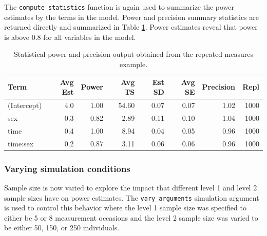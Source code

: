 \documentclass[man,mask,floatsintext]{apa6}
\newenvironment{Shaded}{\begin{snugshade}}{\end{snugshade}}
\newcommand{\DataTypeTok}[1]{\textcolor[rgb]{0.13,0.29,0.53}{#1}}
\newcommand{\KeywordTok}[1]{\textcolor[rgb]{0.13,0.29,0.53}{\textbf{#1}}}
\newcommand{\NormalTok}[1]{#1}
\newcommand{\OperatorTok}[1]{\textcolor[rgb]{0.81,0.36,0.00}{\textbf{#1}}}
\newcommand{\OtherTok}[1]{\textcolor[rgb]{0.56,0.35,0.01}{#1}}
\newcommand{\StringTok}[1]{\textcolor[rgb]{0.31,0.60,0.02}{#1}}
\begin{document}
The \texttt{compute\_statistics} function is again used to summarize the power estimates by the terms in the model. Power and precision summary statistics are returned directly and summarized in Table \ref{tab:long-power}. Power estimates reveal that power is above 0.8 for all variables in the model.

\begin{Shaded}
\end{Shaded}

\begin{table}[t]

\caption{\label{tab:long-power}Statistical power and precision output obtained from the repeated measures example.}
\centering
\begin{tabular}{lrrrrrrr}
\toprule
Term & Avg Est & Power & Avg TS & Est SD & Avg SE & Precision & Repl\\
\midrule
(Intercept) & 4.0 & 1.00 & 54.60 & 0.07 & 0.07 & 1.02 & 1000\\
sex & 0.3 & 0.82 & 2.89 & 0.11 & 0.10 & 1.04 & 1000\\
time & 0.4 & 1.00 & 8.94 & 0.04 & 0.05 & 0.96 & 1000\\
time:sex & 0.2 & 0.87 & 3.11 & 0.06 & 0.06 & 0.96 & 1000\\
\bottomrule
\end{tabular}
\end{table}

\hypertarget{varying-simulation-conditions}{%
\subsubsection{Varying simulation conditions}\label{varying-simulation-conditions}}

Sample size is now varied to explore the impact that different level 1 and level 2 sample sizes have on power estimates. The \texttt{vary\_arguments} simulation argument is used to control this behavior where the level 1 sample size was specified to either be 5 or 8 measurement occasions and the level 2 sample size was varied to be either 50, 150, or 250 individuals.
\end{document}
